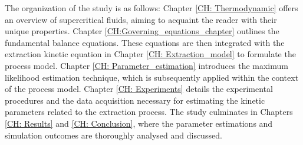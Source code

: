 \documentclass[../Article_Model_Parameters.tex]{subfiles}
\begin{document}
	The organization of the study is as follows: Chapter \ref{CH: Thermodynamic} offers an overview of supercritical fluids, aiming to acquaint the reader with their unique properties. Chapter \ref{CH:Governing_equations_chapter} outlines the fundamental balance equations. These equations are then integrated with the extraction kinetic equation in Chapter \ref{CH: Extraction_model} to formulate the process model. Chapter \ref{CH: Parameter_estimation} introduces the maximum likelihood estimation technique, which is subsequently applied within the context of the process model. Chapter \ref{CH: Experiments} details the experimental procedures and the data acquisition necessary for estimating the kinetic parameters related to the extraction process. The study culminates in Chapters \ref{CH: Results} and \ref{CH: Conclusion}, where the parameter estimations and simulation outcomes are thoroughly analysed and discussed.
		
\end{document}
